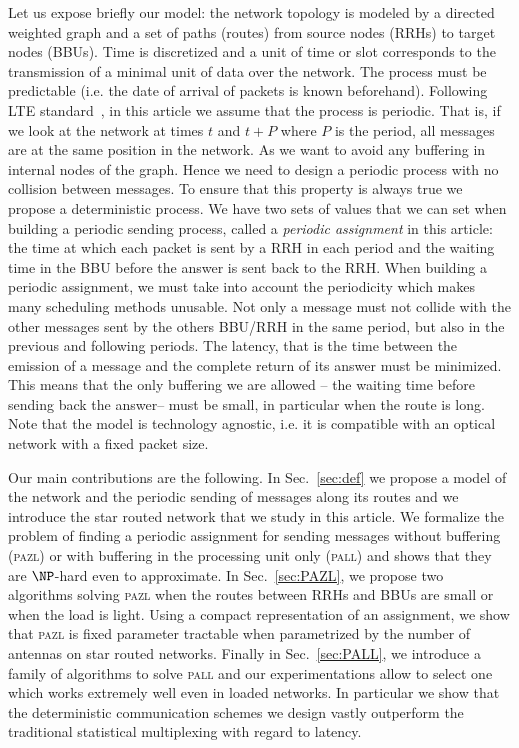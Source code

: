 \documentclass[10pt, conference, letterpaper]{IEEEtran}
\newcommand\pazl{\textsc{pazl}\xspace}
\newcommand\pall{\textsc{pall}\xspace}
\begin{document}
Let us expose briefly our model: the network topology is modeled by a directed weighted graph and a set of paths (routes) from source nodes (RRHs) to target nodes (BBUs). Time is discretized and a unit of time or slot corresponds to the transmission of a minimal unit of data over the network. The process must be  predictable (i.e. the date of arrival of packets is known beforehand). Following LTE standard~\cite{bouguen2012lte}, in this article we assume that the process is periodic. That is, if we look at the network at times $t$ and $t+P$ where $P$ is the period, all messages are at the same position in the network. As we want to avoid any  buffering in internal nodes of the graph. Hence we need to design a periodic process with no collision between messages. To ensure that this property is always true we propose a deterministic process.  We have two sets of values that we can set when building a periodic sending process, called a \emph{periodic assignment} in this article: the time at which each packet is sent by a RRH in each period and the waiting time in the BBU before the answer is sent back to the RRH. When building a periodic assignment, we must take into account the periodicity which makes many scheduling methods unusable. Not only a message must not collide with the other messages sent by the others BBU/RRH in the same period, but also in the previous and following periods. The latency, that is the time between the emission of a message and the complete return of its answer must be minimized. This means that the only buffering we are allowed -- the waiting time before sending back the answer-- must be small, in particular when the route is long. Note that the model is technology agnostic, i.e. it is compatible with an optical network with a fixed packet size.   



Our main contributions are the following.
 In Sec.~\ref{sec:def} we propose a model of the network and the periodic sending of messages along its routes  and we introduce the star routed network that we study in this article. 
 We formalize the problem of finding a periodic assignment for sending messages without buffering (\pazl) or with buffering in the processing unit only (\pall) and shows that they are $\NP$-hard even to approximate. In Sec.~\ref{sec:PAZL}, we propose two algorithms solving \pazl when the routes between RRHs and BBUs are small or when the load is light. Using a compact representation of an assignment, we show that \pazl is fixed parameter tractable when parametrized by the number of antennas on star routed networks. Finally in Sec.~\ref{sec:PALL}, we introduce a family of algorithms to solve \pall and our experimentations allow to select one which works extremely well even in loaded networks. In particular we show that the deterministic communication schemes we design vastly outperform the traditional statistical multiplexing with regard to latency. 
 
\end{document}
